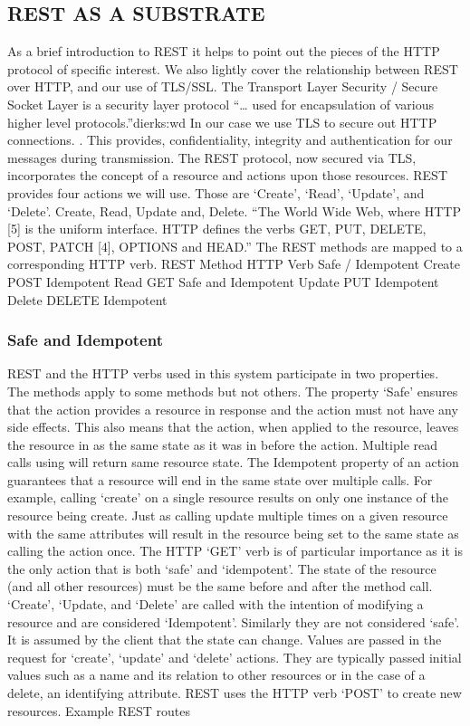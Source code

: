 \subsection{REST AS A SUBSTRATE}
     As a brief introduction to REST it helps to point out the pieces of the HTTP protocol of specific interest. We also lightly cover the relationship between REST over HTTP, and our use of TLS/SSL.   
     The Transport Layer Security / Secure Socket Layer is a security layer protocol “… used for encapsulation of various higher level protocols.”{dierks:wd}  In our case  we use TLS to secure out HTTP connections. \cite{Rescorla:2000tv}.  This provides, confidentiality, integrity and authentication for our messages during transmission. 
     The REST protocol, now secured via TLS, incorporates the concept of a resource and actions upon those resources. REST provides four actions we will use.  Those are ‘Create’, ‘Read’, ‘Update’, and ‘Delete’.  
     Create, Read, Update and, Delete.  
     “The World Wide Web, where HTTP [5] is the uniform interface. HTTP defines the verbs GET, PUT, DELETE, POST, PATCH [4], OPTIONS and HEAD.” 
      The REST methods are mapped to a corresponding HTTP verb.  \cite{Fielding:2000dd}
      REST Method HTTP Verb Safe / Idempotent
      Create  POST  Idempotent
      Read  GET Safe and Idempotent
      Update  PUT Idempotent
      Delete  DELETE  Idempotent


\subsubsection{Safe and Idempotent}
      REST and the HTTP verbs used in this system participate in two properties. The methods apply to some methods but not others.  The property ‘Safe’ ensures that the action provides a resource in response and the action must not have any side effects. This also means that the action, when applied to the resource, leaves the resource in as the same state as it was in before the action.  Multiple read calls using will return same resource state.  
      The Idempotent property of an action guarantees that a resource will end in the same state over multiple calls. For example, calling ‘create’ on a single resource results on only one instance of the resource being create.  Just as calling update multiple times on a given resource with the same attributes will result in the resource being set to the same state as calling the action once.  The HTTP ‘GET’ verb is of particular importance as it is the only action that is both ‘safe’ and ‘idempotent’.  
      The state of the resource (and all other resources) must be the same before and after the method call.  ‘Create’, ‘Update, and ‘Delete’ are called with the intention of modifying a resource and are considered ‘Idempotent’.  Similarly they are not considered ‘safe’.  It is assumed by the client that the state can change.  
       Values are passed in the request for ‘create’, ‘update’ and ‘delete’ actions.  They are typically passed initial values such as a name and its relation to other resources or in the case of a delete, an identifying attribute.  REST uses the HTTP verb ‘POST’ to create new resources.  
       Example REST routes
        
